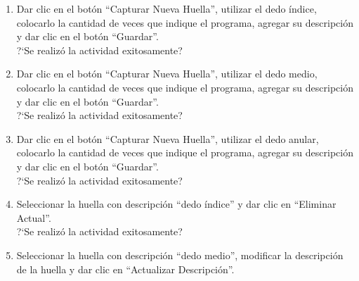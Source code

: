 \begin{enumerate}
	\item {Dar clic en el botón ``Capturar Nueva Huella'', utilizar el dedo índice, colocarlo la cantidad de veces que indique el programa, agregar su descripción y dar clic en el botón ``Guardar''.\\
			?`Se realizó la actividad exitosamente?
	}
	\item {Dar clic en el botón ``Capturar Nueva Huella'', utilizar el dedo medio, colocarlo la cantidad de veces que indique el programa, agregar su descripción y dar clic en el botón ``Guardar''.\\
			?`Se realizó la actividad exitosamente?
	}
	\item {Dar clic en el botón ``Capturar Nueva Huella'', utilizar el dedo anular, colocarlo la cantidad de veces que indique el programa, agregar su descripción y dar clic en el botón ``Guardar''.\\
			?`Se realizó la actividad exitosamente?
	}
	\item {Seleccionar la huella con descripción ``dedo índice'' y dar clic en ``Eliminar Actual''.\\
			?`Se realizó la actividad exitosamente?
	}
	\item {Seleccionar la huella con descripción ``dedo medio'', modificar la descripción de la huella y dar clic en ``Actualizar Descripción''.\\
}
\end{enumerate}
